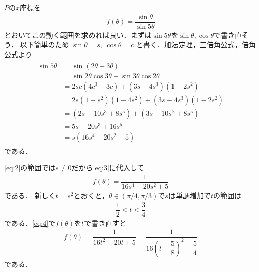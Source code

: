 \documentclass[../../main.tex]{subfiles}
\begin{document}
$P$の$x$座標を
\begin{align}
  f(\theta)=\dfrac{\sin\theta}{\sin5\theta} \label{eq:3}
\end{align}
とおいてこの動く範囲を求めれば良い．まずは$\sin 5\theta$を$\sin\theta,\cos\theta$で書き直そう．
以下簡単のため $\sin\theta=s,\ \cos\theta=c$ と書く．加法定理，三倍角公式，倍角公式より
\begin{align}
  \begin{split}
    \sin5\theta
    &=\sin(2\theta+3\theta) \\
    &=\sin2\theta\cos3\theta+\sin3\theta\cos2\theta \\
    &=2sc(4c^3-3c)+(3s-4s^3)(1-2s^2) \\
    &=2s(1-s^2)(1-4s^2)+(3s-4s^3)(1-2s^2) \\
    &=(2s-10s^3+8s^5)+(3s-10s^3+8s^5) \\
    &=5s-20s^3+16s^5 \\
    &=s(16s^4-20s^2+5)
  \end{split}
\end{align}
である．

\cref{eq:2}の範囲では$s \neq 0$だから\cref{eq:3}に代入して
\begin{align}
  f(\theta)=\dfrac{1}{16s^4-20s^2+5} \label{eq:4}
\end{align}
である．
新しく$t=s^2$とおくと，$\theta\in(\pi/4,\pi/3)$で$s$は単調増加で$t$の範囲は
\begin{align}
  \dfrac{1}{2} < t < \dfrac{3}{4} \label{eq:5}
\end{align}
である．\cref{eq:4}で$f(\theta)$を$t$で書き直すと
\begin{align}
  f(\theta)=\dfrac{1}{16t^2-20t+5}=\dfrac{1}{16\left(t-\dfrac{5}{8}\right)^2-\dfrac{5}{4}}
\end{align}
である．
\end{document}
